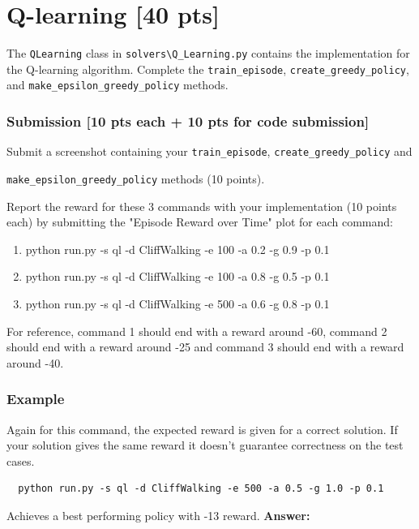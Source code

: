 \documentclass[a4paper]{article}
\theoremstyle{definition}
\begin{document}
\section{Q-learning [40 pts]}

The \verb|QLearning| class in \verb|solvers\Q_Learning.py| contains the implementation for the Q-learning algorithm. Complete the \verb|train_episode|, \verb|create_greedy_policy|,  and \verb|make_epsilon_greedy_policy| methods.

\subsubsection*{Submission [10 pts each + 10 pts for code submission]}

Submit a screenshot containing your \verb|train_episode|, \verb|create_greedy_policy| and 

\verb|make_epsilon_greedy_policy| methods (10 points). 

Report the reward for these 3 commands with your implementation (10 points each) by submitting the "Episode Reward over Time" plot for each command:

\begin{enumerate}
    \item  python run.py -s ql -d CliffWalking -e 100 -a 0.2 -g 0.9 -p 0.1
    \item  python run.py -s ql -d CliffWalking -e 100 -a 0.8 -g 0.5 -p 0.1  
    \item  python run.py -s ql -d CliffWalking -e 500 -a 0.6 -g 0.8 -p 0.1   
\end{enumerate}

For reference, command 1 should end with a reward around -60, command 2 should end with a reward around -25 and command 3 should end with a reward around -40.

\subsubsection*{Example}

Again for this command, the expected reward is given for a correct solution. If your solution gives the same reward it doesn't guarantee correctness on the test cases.

\begin{verbatim}
  python run.py -s ql -d CliffWalking -e 500 -a 0.5 -g 1.0 -p 0.1  
\end{verbatim}

Achieves a best performing policy with -13 reward.
\textbf{Answer:}
\end{document}

